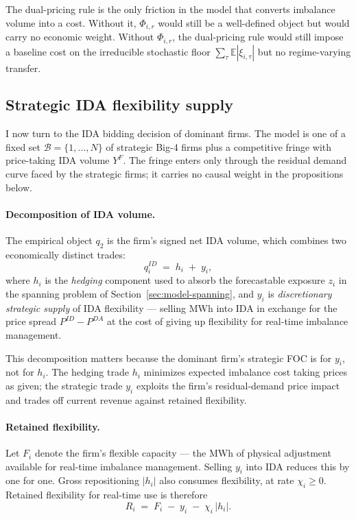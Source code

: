 \documentclass[11pt]{article}
\begin{document}
The dual-pricing rule is the only friction in the model that converts imbalance volume into a cost. Without it, $\Phi_{i,r}$ would still be a well-defined object but would carry no economic weight. Without $\Phi_{i,r}$, the dual-pricing rule would still impose a baseline cost on the irreducible stochastic floor $\sum_{\tau}\mathbb{E}|\xi_{i,\tau}|$ but no regime-varying transfer.

\subsection{Strategic IDA flexibility supply}
\label{sec:model-strategic}

I now turn to the IDA bidding decision of dominant firms. The model is one of a fixed set $\mathcal{B} = \{1,\ldots,N\}$ of strategic Big-4 firms plus a competitive fringe with price-taking IDA volume $Y^{F}$. The fringe enters only through the residual demand curve faced by the strategic firms; it carries no causal weight in the propositions below.

\paragraph{Decomposition of IDA volume.} The empirical object $q_{2}$ is the firm's signed net IDA volume, which combines two economically distinct trades:
\begin{equation}
q^{ID}_{i} \;=\; h_{i} \;+\; y_{i},
\end{equation}
where $h_{i}$ is the \emph{hedging} component used to absorb the forecastable exposure $z_{i}$ in the spanning problem of Section~\ref{sec:model-spanning}, and $y_{i}$ is \emph{discretionary strategic supply} of IDA flexibility --- selling MWh into IDA in exchange for the price spread $P^{ID} - P^{DA}$ at the cost of giving up flexibility for real-time imbalance management.

This decomposition matters because the dominant firm's strategic FOC is for $y_{i}$, not for $h_{i}$. The hedging trade $h_{i}$ minimizes expected imbalance cost taking prices as given; the strategic trade $y_{i}$ exploits the firm's residual-demand price impact and trades off current revenue against retained flexibility.

\paragraph{Retained flexibility.} Let $F_{i}$ denote the firm's flexible capacity --- the MWh of physical adjustment available for real-time imbalance management. Selling $y_{i}$ into IDA reduces this by one for one. Gross repositioning $|h_{i}|$ also consumes flexibility, at rate $\chi_{i} \ge 0$. Retained flexibility for real-time use is therefore
\begin{equation}
R_{i} \;=\; F_{i} \;-\; y_{i} \;-\; \chi_{i}\,|h_{i}|.
\end{equation}
\end{document}
